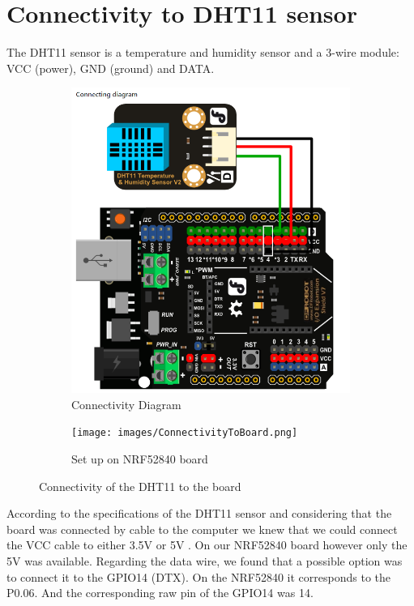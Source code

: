 \section{Connectivity to DHT11 sensor}
The DHT11 sensor is a temperature and humidity sensor and a 3-wire module: VCC (power), GND (ground) and DATA.\\

\begin{figure}
    \centering
    \begin{subfigure}[b]{0.45\columnwidth}
        \centering
        \includegraphics[scale=0.2]{images/connectingdiagram.png}
        \caption{Connectivity Diagram}
    \end{subfigure}
    \qquad
    \begin{subfigure}[b]{0.45\columnwidth}
        \centering
        \texttt{[image: images/ConnectivityToBoard.png]}
        \caption{Set up on NRF52840 board}
    \end{subfigure}
    \caption{Connectivity of the DHT11 to the board}
    \label{fig:connectionDHT11}
\end{figure}

According to the specifications of the DHT11 sensor and considering that the board was connected by cable to the computer we
knew that we could connect the VCC cable to either 3.5V or 5V \cite{b1}. On our NRF52840 board however only the 5V was available. 
Regarding the data wire, we found that a possible option was to connect it to the GPIO14 (DTX)\cite{b2}. On the NRF52840 it 
corresponds to the P0.06. And the corresponding raw pin of the GPIO14 was 14.
